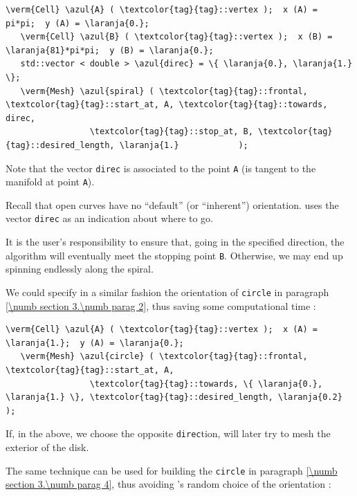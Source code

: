 \begin{Verbatim}[commandchars=\\\{\},formatcom=\small\tt,
   baselinestretch=0.94,framesep=2mm                     ]
   \verm{Cell} \azul{A} ( \textcolor{tag}{tag}::vertex );  x (A) =    pi*pi;  y (A) = \laranja{0.};
   \verm{Cell} \azul{B} ( \textcolor{tag}{tag}::vertex );  x (B) = \laranja{81}*pi*pi;  y (B) = \laranja{0.};
   std::vector < double > \azul{direc} = \{ \laranja{0.}, \laranja{1.} \};
   \verm{Mesh} \azul{spiral} ( \textcolor{tag}{tag}::frontal, \textcolor{tag}{tag}::start_at, A, \textcolor{tag}{tag}::towards, direc,
                 \textcolor{tag}{tag}::stop_at, B, \textcolor{tag}{tag}::desired_length, \laranja{1.}            );
\end{Verbatim}

Note that the vector {\small\tt direc} is associated to the point {\small\tt A}
(is tangent to the manifold at point {\small\tt A}).

Recall that open curves have no ``default'' (or ``inherent'') orientation.
{\ManiFEM} uses the vector {\small\tt direc} as an indication about where to go.

It is the user's responsibility to ensure that, going in the specified direction,
the algorithm will eventually meet the stopping point {\small\tt B}.
Otherwise, we may end up spinning endlessly along the spiral.

We could specify in a similar fashion the orientation of {\small\tt circle} in paragraph
\ref{\numb section 3.\numb parag 2}, thus saving some computational time :

\begin{Verbatim}[commandchars=\\\{\},formatcom=\small\tt,
   baselinestretch=0.94,framesep=2mm                     ]
   \verm{Cell} \azul{A} ( \textcolor{tag}{tag}::vertex );  x (A) = \laranja{1.};  y (A) = \laranja{0.};
   \verm{Mesh} \azul{circle} ( \textcolor{tag}{tag}::frontal, \textcolor{tag}{tag}::start_at, A,
                 \textcolor{tag}{tag}::towards, \{ \laranja{0.}, \laranja{1.} \}, \textcolor{tag}{tag}::desired_length, \laranja{0.2} );
\end{Verbatim}

If, in the above, we choose the opposite {\small\tt direc}tion,
{\maniFEM} will later try to mesh the exterior of the disk.

The same technique can be used for building the {\small\tt circle} in paragraph
\ref{\numb section 3.\numb parag 4}, thus avoiding \maniFEM's random choice of the orientation :

